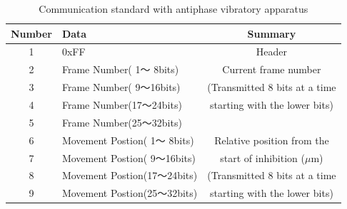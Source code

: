 \begin{table}[tb]
  \centering
  \caption{Communication standard with antiphase vibratory apparatus}
  \label{table:interface}
  \begin{tabular}{|c|l|c|}
    \hline
    Number & Data & Summary                                         \\ \hline \hline
    1 &          0xFF            &   Header                         \\ \hline \hline
    2 & Frame Number( 1〜 8bits) &  Current frame number            \\ \cline{1-2}
    3 & Frame Number( 9〜16bits) &  (Transmitted 8 bits at a time   \\ \cline{1-2}
    4 & Frame Number(17〜24bits) &   starting with the lower bits)  \\ \cline{1-2}
    5 & Frame Number(25〜32bits) &                                  \\ \hline \hline
    6 & Movement Postion( 1〜 8bits)  &  Relative position from the    \\ \cline{1-2}
    7 & Movement Postion( 9〜16bits)  &  start of inhibition ($\mu$m)  \\ \cline{1-2}
    8 & Movement Postion(17〜24bits)  &  (Transmitted 8 bits at a time \\ \cline{1-2}
    9 & Movement Postion(25〜32bits)  &  starting with the lower bits) \\ \hline
  \end{tabular}
\end{table}





